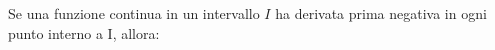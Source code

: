 Se una funzione continua in un intervallo $I$ ha derivata prima negativa in ogni punto interno a I, allora:
